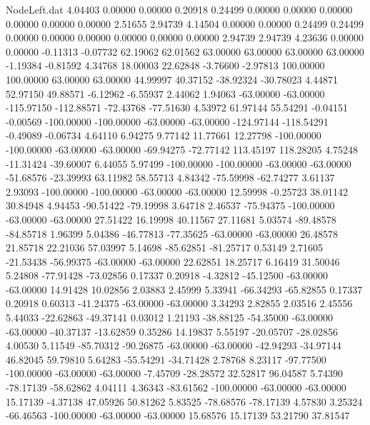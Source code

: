 \begin{filecontents}{NodeLeft.dat}
   4.04403    0.00000    0.00000     0.20918    0.24499    0.00000    0.00000    0.00000    0.00000    0.00000    0.00000    2.51655    2.94739
   4.14504    0.00000    0.00000     0.24499    0.24499    0.00000    0.00000    0.00000    0.00000    0.00000    0.00000    2.94739    2.94739
   4.23636    0.00000    0.00000    -0.11313   -0.07732   62.19062   62.01562   63.00000   63.00000   63.00000   63.00000   -1.19384   -0.81592
   4.34768   18.00003   22.62848    -3.76600   -2.97813  100.00000  100.00000   63.00000   63.00000   44.99997   40.37152  -38.92324  -30.78023
   4.44871   52.97150   49.88571    -6.12962   -6.55937    2.44062    1.94063  -63.00000  -63.00000 -115.97150 -112.88571  -72.43768  -77.51630
   4.53972   61.97144   55.54291    -0.04151   -0.00569 -100.00000 -100.00000  -63.00000  -63.00000 -124.97144 -118.54291   -0.49089   -0.06734
   4.64110    6.94275    9.77142    11.77661   12.27798 -100.00000 -100.00000  -63.00000  -63.00000  -69.94275  -72.77142  113.45197  118.28205
   4.75248  -11.31424  -39.60007     6.44055    5.97499 -100.00000 -100.00000  -63.00000  -63.00000  -51.68576  -23.39993   63.11982   58.55713
   4.84342  -75.59998  -62.74277     3.61137    2.93093 -100.00000 -100.00000  -63.00000  -63.00000   12.59998   -0.25723   38.01142   30.84948
   4.94453  -90.51422  -79.19998     3.64718    2.46537  -75.94375 -100.00000  -63.00000  -63.00000   27.51422   16.19998   40.11567   27.11681
   5.03574  -89.48578  -84.85718     1.96399    5.04386  -46.77813  -77.35625  -63.00000  -63.00000   26.48578   21.85718   22.21036   57.03997
   5.14698  -85.62851  -81.25717     0.53149    2.71605  -21.53438  -56.99375  -63.00000  -63.00000   22.62851   18.25717    6.16419   31.50046
   5.24808  -77.91428  -73.02856     0.17337    0.20918   -4.32812  -45.12500  -63.00000  -63.00000   14.91428   10.02856    2.03883    2.45999
   5.33941  -66.34293  -65.82855     0.17337    0.20918    0.60313  -41.24375  -63.00000  -63.00000    3.34293    2.82855    2.03516    2.45556
   5.44033  -22.62863  -49.37141     0.03012    1.21193  -38.88125  -54.35000  -63.00000  -63.00000  -40.37137  -13.62859    0.35286   14.19837
   5.55197  -20.05707  -28.02856     4.00530    5.11549  -85.70312  -90.26875  -63.00000  -63.00000  -42.94293  -34.97144   46.82045   59.79810
   5.64283  -55.54291  -34.71428     2.78768    8.23117  -97.77500 -100.00000  -63.00000  -63.00000   -7.45709  -28.28572   32.52817   96.04587
   5.74390  -78.17139  -58.62862     4.04111    4.36343  -83.61562 -100.00000  -63.00000  -63.00000   15.17139   -4.37138   47.05926   50.81262
   5.83525  -78.68576  -78.17139     4.57830    3.25324  -66.46563 -100.00000  -63.00000  -63.00000   15.68576   15.17139   53.21790   37.81547

\end{filecontents}
